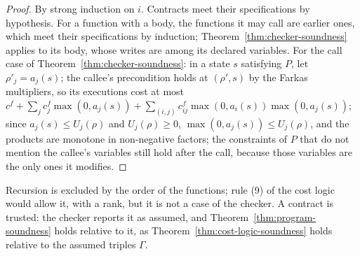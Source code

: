 \documentclass[oneside,english]{amsart}
\numberwithin{equation}{section}
\numberwithin{figure}{section}
\theoremstyle{plain}
\theoremstyle{definition}
\theoremstyle{plain}
\theoremstyle{remark}
\theoremstyle{plain}
\theoremstyle{definition}
\theoremstyle{plain}
\theoremstyle{remark}
\begin{document}
\begin{proof}
By strong induction on $i$. Contracts meet their specifications by hypothesis. For a function with a body, the functions it may call are earlier ones, which meet their specifications by induction; Theorem~\ref{thm:checker-soundness} applies to its body, whose writes are among its declared variables. For the call case of Theorem~\ref{thm:checker-soundness}: in a state $s$ satisfying $P$, let $\rho'_j = a_j(s)$; the callee's precondition holds at $(\rho', s)$ by the Farkas multipliers, so its executions cost at most $c^f + \sum_j c^f_j \max(0, a_j(s)) + \sum_{(i,j)} c^f_{ij} \max(0, a_i(s)) \max(0, a_j(s))$; since $a_j(s) \le U_j(\rho)$ and $U_j(\rho) \ge 0$, $\max(0, a_j(s)) \le U_j(\rho)$, and the products are monotone in non-negative factors; the constraints of $P$ that do not mention the callee's variables still hold after the call, because those variables are the only ones it modifies.
\end{proof}

Recursion is excluded by the order of the functions; rule (9) of the cost logic would allow it, with a rank, but it is not a case of the checker. A contract is trusted: the checker reports it as assumed, and Theorem~\ref{thm:program-soundness} holds relative to it, as Theorem~\ref{thm:cost-logic-soundness} holds relative to the assumed triples $\Gamma$.
\end{document}
